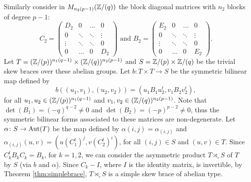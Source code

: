 Similarly consider in $M_{n_2(p-1)}(\mathbb{Z}/(q))$ the block diagonal matrices with $n_2$ blocks of degree $p-1$:
$$C_2=\left(\begin{array}{cccc}
	D_2&0&\ldots &0\\
	0&\ddots &\ddots&\vdots\\
	\vdots &\ddots &\ddots &0\\
	0&\ldots&0&D_2\end{array}\right)\mbox{ and } B_2=\left(\begin{array}{cccc}
	E_2&0&\ldots &0\\
	0&\ddots &\ddots&\vdots\\
	\vdots &\ddots &\ddots &0\\
	0&\ldots&0&E_2\end{array}\right).$$
Let $T=(\mathbb{Z}/(p))^{n_1(q-1)}\times (\mathbb{Z}/(q))^{n_2(p-1)}$ and $S=\mathbb{Z}/(p)\times\mathbb{Z}/(q)$ be the trivial skew braces over these abelian groups.
Let $b\colon T\times T\rightarrow S$ be the symmetric bilinear map defined by
$$b((u_1,v_1),(u_2,v_2))=(u_1B_1u_2^t,v_1B_2v_2^t),$$
for all $u_1,u_2\in (\mathbb{Z}/(p))^{n_1(q-1)}$ and $v_1,v_2\in (\mathbb{Z}/(q))^{n_2(p-1)}$. Note that $\det(B_1)=(-q)^{q-2}\neq 0$ and $\det(B_2)=(-p)^{p-2}\neq 0$, thus the symmetric bilinear forms associated to these matrices are non-degenerate.
Let $\alpha\colon S\rightarrow \operatorname{Aut}(T)$ be the map defined by $\alpha(i,j)=\alpha_{(i,j)}$ and $\alpha_{(i,j)}(u,v)=(u(C_1^{t})^j,v(C_2^t)^{i})$, for all $(i,j)\in S$ and $(u,v)\in T$. Since $C_k^tB_kC_k=B_k$, for $k=1,2$, we can consider the asymmetric product $T\rtimes_{\circ}S$ of $T$ by $S$ (via $b$ and $\alpha$). Since $C_k-I$, where $I$ is the identity matrix, is invertible, by Theorem \ref{thm:simplebrace}, $T\rtimes_{\circ}S$ is a simple skew brace of abelian type. 

